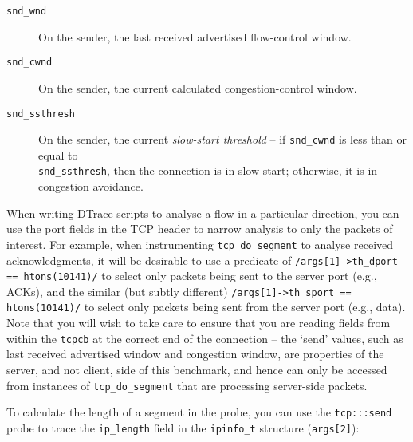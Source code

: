 \documentclass[a4paper,10pt]{article}
\begin{document}
\begin{description}
	\item[\texttt{snd\_wnd}] On the sender, the last received advertised
  flow-control window.
\item[\texttt{snd\_cwnd}] On the sender, the current calculated
  congestion-control window.
\item[\texttt{snd\_ssthresh}] On the sender, the current \textit{slow-start
  threshold} -- if \texttt{snd\_cwnd} is less than or equal to \\
  \texttt{snd\_ssthresh},
  then the connection is in slow start; otherwise, it is in congestion
  avoidance.
\end{description}

When writing DTrace scripts to analyse a flow in a particular direction, you
can use the port fields in the TCP header to narrow analysis to only the
packets of interest.
For example, when instrumenting \texttt{tcp\_do\_segment} to analyse received
acknowledgments, it will be desirable to use a predicate of
\texttt{/args[1]->th\_dport == htons(10141)/} to select only packets being
sent to the server port (e.g., ACKs), and the similar (but subtly different)
\texttt{/args[1]->th\_sport == htons(10141)/} to select only packets being
sent from the server port (e.g., data).
Note that you will wish to take care to ensure that you are reading fields
from within the \texttt{tcpcb} at the correct end of the connection -- the
`send' values, such as last received advertised window and congestion window,
are properties of the server, and not client, side of this benchmark, and
hence can only be accessed from instances of \texttt{tcp\_do\_segment} that
are processing server-side packets.

To calculate the length of a segment in the probe, you can use the
\texttt{tcp:::send} probe to trace the \texttt{ip\_length} field in
the \texttt{ipinfo\_t} structure (\texttt{args[2]}):


\end{document}
